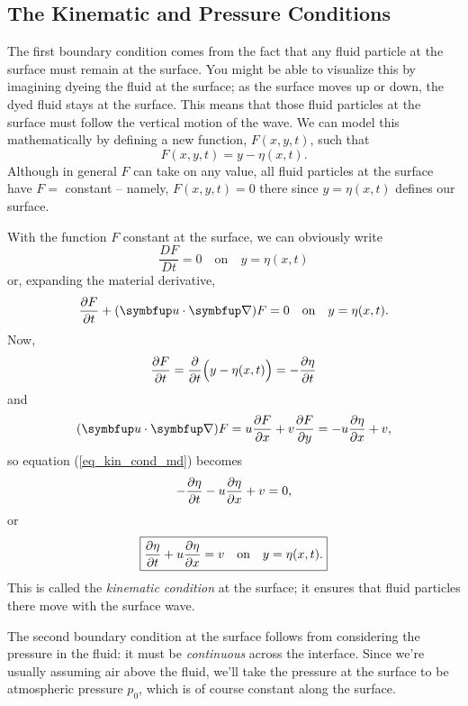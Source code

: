 
\subsection{The Kinematic and Pressure Conditions}
\label{sec_kin_press_cond}

The first boundary condition comes from the fact that any fluid particle at the surface must remain at the surface.  You might be able to visualize this by imagining dyeing the fluid at the surface; as the surface moves up or down, the dyed fluid stays at the surface.  This means that those fluid particles at the surface must follow the vertical motion of the wave.  We can model this mathematically by defining a new function, $F(x, y, t)$, such that
\begin{equation}
F(x, y, t) = y - \eta(x, t).
\end{equation}
Although in general $F$ can take on any value, all fluid particles at the surface have $F =$ constant -- namely, $F(x, y, t) = 0$ there since $y = \eta(x, t)$ defines our surface.

With the function $F$ constant at the surface, we can obviously write
\[
\frac{DF}{Dt} = 0 \quad \text{on} \quad y = \eta(x, t)
\]
or, expanding the material derivative,
\begin{equation}
\label{eq_kin_cond_md}
\dfdx{F}{t} + (\vec{u} \cdot \grad ) F = 0 \quad \text{on} \quad y = \eta(x, t).
\end{equation}
Now,
\[
\frac{\partial {F}}{\partial {t}} = \frac{\partial}{\partial t} \Bigl( y - \eta(x, t) \Bigr) = -\frac{\partial {\eta}}{\partial {t}}
\]
and
\[
(\vec{u} \cdot \grad) F = u \dfdx{F}{x} + v\dfdx{F}{y} = -u \dfdx{\eta}{x} + v,
\]
so equation (\ref{eq_kin_cond_md}) becomes
\[
-\frac{\partial {\eta}}{\partial {t}} - u\frac{\partial {\eta}}{\partial {x}} + v = 0,
\]
or
\begin{equation}
\label{eq_kin_cond}
\boxed{
\frac{\partial {\eta}}{\partial {t}} + u\frac{\partial {\eta}}{\partial {x}} = v \quad \text{on} \quad y = \eta(x, t).
}
\end{equation}
This is called the \emph{kinematic condition} at the surface; it ensures that fluid particles there move with the surface wave.

The second boundary condition at the surface follows from considering the pressure in the fluid:  it must be \emph{continuous} across the interface.  Since we're usually assuming air above the fluid, we'll take the pressure at the surface to be atmospheric pressure $p_0$, which is of course constant along the surface.  

